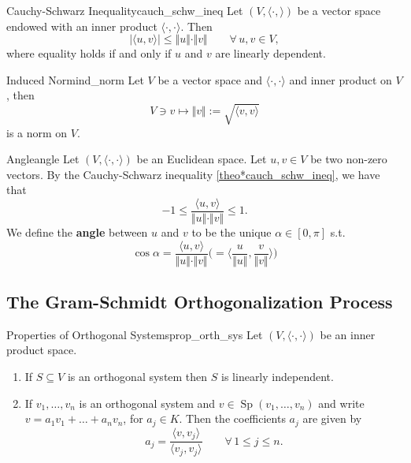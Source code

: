 \begin{theorem}{Cauchy-Schwarz Inequality}{cauch_schw_ineq}
	Let $(V, \langle \cdot , \rangle)$ be a vector space endowed with an inner product $\langle \cdot , \cdot \rangle$. Then
	\[
		|\langle u, v \rangle | \leq \Vert u \Vert \cdot \Vert v \Vert \qquad \forall\, u, v \in V,
	\]
	where equality holds if and only if $u$ and $v$ are linearly dependent.
\end{theorem}

\begin{corollary}{Induced Norm}{ind_norm}
	Let $V$ be a vector space and $\langle \cdot , \cdot \rangle$ and inner product on $V$, then
	\[
	V \owns v \mapsto \Vert v \Vert := \sqrt{\langle v , v \rangle}
	\]
	is a norm on $V$.
\end{corollary}

\begin{definition}{Angle}{angle}
	Let $(V, \langle \cdot , \cdot \rangle)$ be an Euclidean space. Let $u, v \in V$ be two non-zero vectors. By the Cauchy-Schwarz inequality \ref{theo*cauch_schw_ineq}, we have that
	\[
		-1 \leq \frac{\langle u, v \rangle}{\Vert u \Vert \cdot \Vert v \Vert} \leq 1.
	\]
	We define the \textbf{angle} between $u$ and $v$ to be the unique $\alpha \in [0, \pi]$ s.t.
	\[
		\cos \alpha = \frac{\langle u, v \rangle}{\Vert u \Vert \cdot \Vert v \Vert} \bigg( = \langle \frac{u}{\Vert u \Vert} , \frac{v}{\Vert v \Vert} \rangle \bigg)
	\]
\end{definition}

\subsection{The Gram-Schmidt Orthogonalization Process}

\begin{theorem}{Properties of Orthogonal Systems}{prop_orth_sys}
	Let $(V, \langle \cdot , \cdot \rangle)$ be an inner product space.
	\begin{enumerate}
		\item If $S \subseteq V$ is an orthogonal system then $S$ is linearly independent.
		\item If $v_1,\hdots , v_n$ is an orthogonal system and $v \in \operatorname{Sp}(v_1, \hdots , v_n)$ and write $v = a_1v_1 + \hdots + a_nv_n$, for $a_j \in K$. Then the coefficients $a_j$ are given by
		\[
			a_j = \frac{\langle v, v_j \rangle}{\langle v_j, v_j \rangle} \qquad \forall \, 1 \leq j \leq n.
		\]
	\end{enumerate}
\end{theorem}

